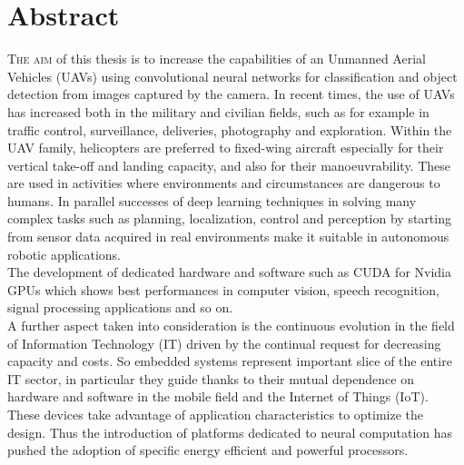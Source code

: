 \chapter*{Abstract}
\label{chap:abstract}
%
%
\lettrine[lines=3]{T}{he aim} of this thesis is to increase the capabilities of
an Unmanned Aerial Vehicles (UAVs) using convolutional neural networks for
classification and object detection from images captured by the camera.
In recent times, the use of UAVs has increased both in the military and civilian
fields, such as for example in traffic control, surveillance, deliveries,
photography and exploration.
Within the UAV family, helicopters are preferred to fixed-wing aircraft
especially for their vertical take-off and landing capacity, and also for their
manoeuvrability.
These are used in activities where environments and circumstances are dangerous
to humans.
In parallel successes of deep learning techniques in solving many complex tasks
such as planning, localization, control and perception by starting from sensor
data acquired in real environments make it suitable in autonomous robotic
applications.\\
The development of dedicated hardware and software such as CUDA for Nvidia GPUs
which shows best performances in computer vision, speech recognition,
signal processing applications and so on.\\
A further aspect taken into consideration is the continuous evolution in the
field of Information Technology (IT) driven by the continual request for
decreasing capacity and costs.
So embedded systems represent important slice of the entire IT sector, in
particular they guide thanks to their mutual dependence on hardware and software
in the mobile field and the Internet of Things (IoT).\\
These devices take advantage of application characteristics to optimize the
design. Thus the introduction of platforms dedicated to neural computation has
pushed the adoption of specific energy efficient and powerful processors.\\

